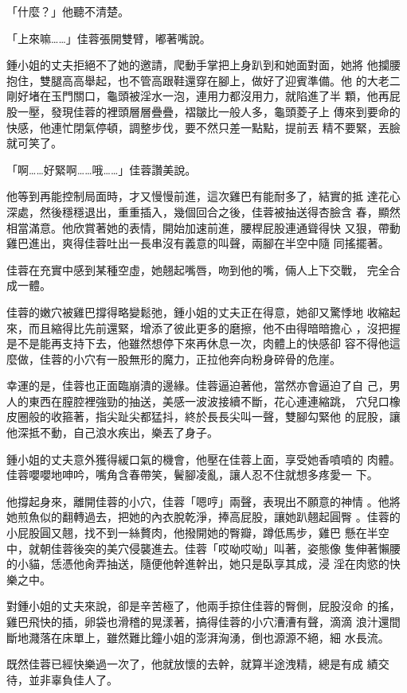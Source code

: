 「什麼？」他聽不清楚。

「上來嘛……」佳蓉張開雙臂，嘟著嘴說。

鍾小姐的丈夫拒絕不了她的邀請，爬動手掌把上身趴到和她面對面，她將
他攔腰抱住，雙腿高高舉起，也不管高跟鞋還穿在腳上，做好了迎賓準備。他
的大老二剛好堵在玉門關口，龜頭被淫水一泡，連用力都沒用力，就陷進了半
顆，他再屁股一壓，發現佳蓉的裡頭層層疊疊，褶皺比一般人多，龜頭菱子上
傳來到要命的快感，他連忙閉氣停頓，調整步伐，要不然只差一點點，提前丟
精不要緊，丟臉就可笑了。

「啊……好緊啊……哦……」佳蓉讚美說。

他等到再能控制局面時，才又慢慢前進，這次雞巴有能耐多了，結實的抵
達花心深處，然後穩穩退出，重重插入，幾個回合之後，佳蓉被抽送得杏臉含
春，顯然相當滿意。他欣賞著她的表情，開始加速前進，腰桿屁股連通聳得快
又狠，帶動雞巴進出，爽得佳蓉吐出一長串沒有義意的叫聲，兩腳在半空中隨
同搖擺著。

佳蓉在充實中感到某種空虛，她翹起嘴唇，吻到他的嘴，倆人上下交戰，
完全合成一體。

佳蓉的嫩穴被雞巴撐得略變鬆弛，鍾小姐的丈夫正在得意，她卻又驚悸地
收縮起來，而且縮得比先前還緊，增添了彼此更多的磨擦，他不由得暗暗擔心
，沒把握是不是能再支持下去，他雖然想停下來再休息一次，肉體上的快感卻
容不得他這麼做，佳蓉的小穴有一股無形的魔力，正拉他奔向粉身碎骨的危崖。

幸運的是，佳蓉也正面臨崩潰的邊緣。佳蓉逼迫著他，當然亦會逼迫了自
己，男人的東西在膣腔裡強勁的抽送，美感一波波接續不斷，花心連連縮跳，
穴兒口橡皮圈般的收箍著，指尖趾尖都猛抖，終於長長尖叫一聲，雙腳勾緊他
的屁股，讓他深抵不動，自己浪水疾出，樂丟了身子。

鍾小姐的丈夫意外獲得緩口氣的機會，他壓在佳蓉上面，享受她香噴噴的
肉體。佳蓉嚶嚶地呻吟，嘴角含春帶笑，鬢腳凌亂，讓人忍不住就想多疼愛一
下。

他撐起身來，離開佳蓉的小穴，佳蓉「嗯哼」兩聲，表現出不願意的神情
。他將她煎魚似的翻轉過去，把她的內衣脫乾淨，捧高屁股，讓她趴翹起圓臀
。佳蓉的小屁股圓又翹，找不到一絲贅肉，他撥開她的臀瓣，蹲低馬步，雞巴
懸在半空中，就朝佳蓉後突的美穴侵襲進去。佳蓉「哎呦哎呦」叫著，姿態像
隻伸著懶腰的小貓，恁憑他肏弄抽送，隨便他幹進幹出，她只是臥享其成，浸
淫在肉慾的快樂之中。

對鍾小姐的丈夫來說，卻是辛苦極了，他兩手掠住佳蓉的臀側，屁股沒命
的搖，雞巴飛快的插，卵袋也滑稽的晃漾著，搞得佳蓉的小穴漕漕有聲，滴滴
浪汁還間斷地濺落在床單上，雖然難比鐘小姐的澎湃洶湧，倒也源源不絕，細
水長流。

既然佳蓉已經快樂過一次了，他就放懷的去幹，就算半途洩精，總是有成
績交待，並非辜負佳人了。

